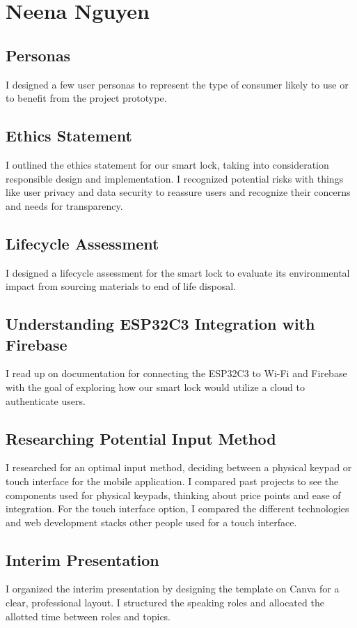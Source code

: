 \section{Neena Nguyen}

\subsection{Personas}
I designed a few user personas to represent the type of consumer likely to use or to benefit from the project prototype. 

\subsection{Ethics Statement}
I outlined the ethics statement for our smart lock, taking into consideration responsible design and implementation. I recognized potential risks with things like user privacy and data security to reassure users and recognize their concerns and needs for transparency.

\subsection{Lifecycle Assessment}
I designed a lifecycle assessment for the smart lock to evaluate its environmental impact from sourcing materials to end of life disposal.

\subsection{Understanding ESP32C3 Integration with Firebase}
I read up on documentation for connecting the ESP32C3 to Wi-Fi and Firebase with the goal of exploring how our smart lock would utilize a cloud to authenticate users.

\subsection{Researching Potential Input Method}
I researched for an optimal input method, deciding between a physical keypad or touch interface for the mobile application. I compared past projects to see the components used for physical keypads, thinking about price points and ease of integration. For the touch interface option, I compared the different technologies and web development stacks other people used for a touch interface. 

\subsection{Interim Presentation}
I organized the interim presentation by designing the template on Canva for a clear, professional layout. I structured the speaking roles and allocated the allotted time between roles and topics.